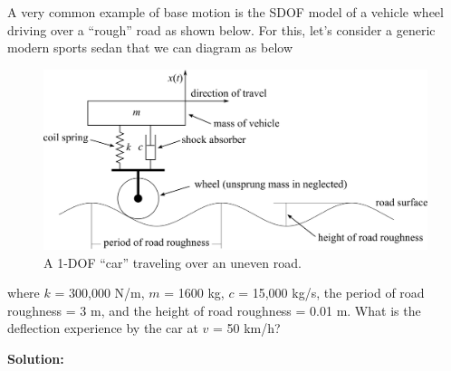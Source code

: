\documentclass[12pt,letter]{article}
\begin{document}
		\begin{example}

			A very common example of base motion is the SDOF model of a vehicle wheel driving over a ``rough'' road as shown below. For this, let's consider a generic modern sports sedan that we can diagram as below
			\begin{figure}[H]
				\centering
				\includegraphics[]{../figures/vehicle_on_road_example.png}
				\caption{A 1-DOF ``car'' traveling over an uneven road.}
			\end{figure}				
			\noindent where $k$ = 300,000 N/m, $m$ = 1600 kg, $c$ = 15,000 kg/s, the period of road roughness = 3 m, and the height of road roughness = 0.01 m. What is the deflection experience by the car at $v$ = 50 km/h?
			
			\noindent\textbf{Solution:}


\end{example}
\end{document}

